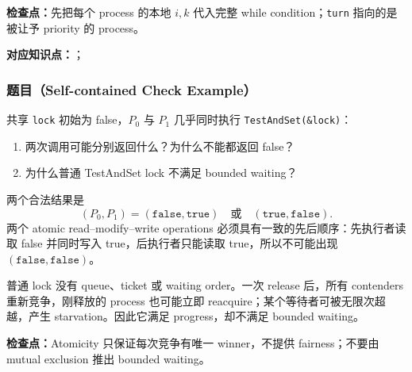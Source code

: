 \textbf{检查点：}先把每个 process 的本地 $i,k$ 代入完整 while condition；\texttt{turn} 指向的是被让予 priority 的 process。


\textbf{对应知识点：}；

\subsubsection*{题目（Self-contained Check Example）}

共享 \texttt{lock} 初始为 false，$P_0$ 与 $P_1$ 几乎同时执行 \texttt{TestAndSet(\&lock)}：
\begin{enumerate}
  \item 两次调用可能分别返回什么？为什么不能都返回 false？
  \item 为什么普通 TestAndSet lock 不满足 bounded waiting？
\end{enumerate}

\begin{checkedsolution}
两个合法结果是
\[
  (P_0,P_1)=(\texttt{false},\texttt{true})
  \quad\text{或}\quad
  (\texttt{true},\texttt{false}).
\]
两个 atomic read--modify--write operations 必须具有一致的先后顺序：先执行者读取 false 并同时写入 true，后执行者只能读取 true，所以不可能出现 $(\texttt{false},\texttt{false})$。

普通 lock 没有 queue、ticket 或 waiting order。一次 release 后，所有 contenders 重新竞争，刚释放的 process 也可能立即 reacquire；某个等待者可被无限次超越，产生 starvation。因此它满足 progress，却不满足 bounded waiting。
\end{checkedsolution}

\textbf{检查点：}Atomicity 只保证每次竞争有唯一 winner，不提供 fairness；不要由 mutual exclusion 推出 bounded waiting。
